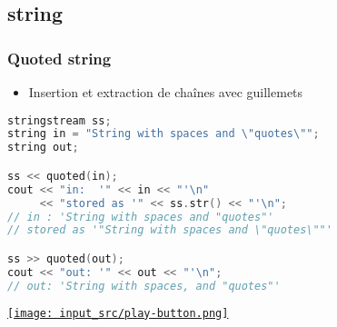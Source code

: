\documentclass[C++.tex]{subfiles}
\begin{document}
\subsection*{string}
\begin{frame}[fragile]
	\frametitle{Quoted string}
	\begin{itemize}
		\item Insertion et extraction de chaînes avec guillemets
	\end{itemize}

	\begin{lstlisting}[language=C++]
stringstream ss;
string in = "String with spaces and \"quotes\"";
string out;

ss << quoted(in);
cout << "in:  '" << in << "'\n"
     << "stored as '" << ss.str() << "'\n";
// in : 'String with spaces and "quotes"'
// stored as '"String with spaces and \"quotes\""'

ss >> quoted(out);
cout << "out: '" << out << "'\n";
// out: 'String with spaces, and "quotes"'\end{lstlisting}


	\hfill
	\href{https://godbolt.org/#g:!((g:!((g:!((h:codeEditor,i:(filename:'1',fontScale:14,fontUsePx:'0',j:1,lang:c%2B%2B,selection:(endColumn:1,endLineNumber:18,positionColumn:1,positionLineNumber:18,selectionStartColumn:1,selectionStartLineNumber:1,startColumn:1,startLineNumber:1),source:'%23include+%3Ciostream%3E%0A%23include+%3Cstring%3E%0A%23include+%3Csstream%3E%0A%23include+%3Ciomanip%3E%0A%0Aint+main()%0A%7B%0A++std::stringstream+ss%3B%0A++std::string+in+%3D+%22String+with+spaces+and+%5C%22quotes%5C%22%22%3B%0A++std::string+out%3B%0A%0A++ss+%3C%3C+std::quoted(in)%3B%0A++std::cout+%3C%3C+%22in:++!'%22+%3C%3C+in+%3C%3C+%22!'%5Cn%22+%3C%3C+%22stored+as+!'%22+%3C%3C+ss.str()+%3C%3C+%22!'%5Cn%22%3B%0A%0A++ss+%3E%3E+std::quoted(out)%3B%0A++std::cout+%3C%3C+%22out:+!'%22+%3C%3C+out+%3C%3C+%22!'%5Cn%22%3B%0A%7D%0A'),l:'5',n:'0',o:'C%2B%2B+source+%231',t:'0')),k:50,l:'4',n:'0',o:'',s:0,t:'0'),(g:!((h:executor,i:(argsPanelShown:'1',compilationPanelShown:'0',compiler:g122,compilerName:'',compilerOutShown:'0',execArgs:'',execStdin:'',fontScale:14,fontUsePx:'0',j:1,lang:c%2B%2B,libs:!((name:boost,ver:'175')),options:'-std%3Dc%2B%2B14+-Wall+-Wextra',source:1,stdinPanelShown:'1',tree:'1',wrap:'0'),l:'5',n:'0',o:'Executor+x86-64+gcc+12.2+(C%2B%2B,+Editor+%231)',t:'0')),header:(),k:50,l:'4',n:'0',o:'',s:0,t:'0')),l:'2',n:'0',o:'',t:'0')),version:4}{\texttt{[image: input\_src/play-button.png]}}
\end{frame}
\end{document}
